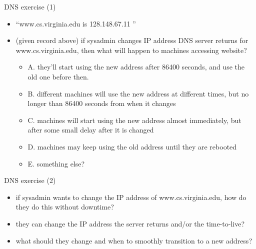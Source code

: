 \begin{frame}{DNS exercise (1)}
    \begin{itemize}
    \item ``www.cs.virginia.edu is 128.148.67.11 ''
    \item (given record above)
    if sysadmin changes IP address DNS server returns for www.cs.virginia.edu,
    then what will happen to machines accessing website?
        \begin{itemize}
        \item A. they'll start using the new address after 86400 seconds, and use the old one before then.
        \item B. different machines will use the new address at different times, but no longer than 86400 seconds from when it changes
        \item C. machines will start using the new address almost immediately, but after some small delay after it is changed
        \item D. machines may keep using the old address until they are rebooted
        \item E. something else?
        \end{itemize}
    \end{itemize}
\end{frame}

\begin{frame}{DNS exercise (2)}
    \begin{itemize}
    \item if sysadmin wants to change the IP address of www.cs.virginia.edu,
            how do they do this without downtime?
    \vspace{.5cm}
    \item they can change the IP address the server returns and/or the time-to-live?
    \item what should they change and when to smoothly transition to a new address?
    \end{itemize}
\end{frame}


